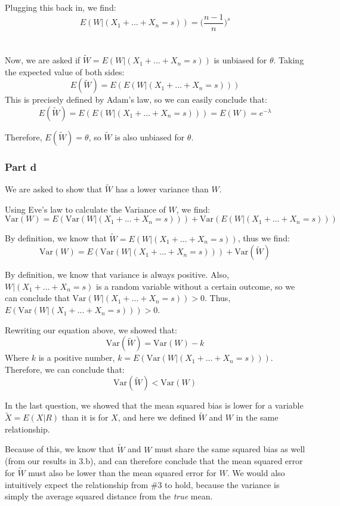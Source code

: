 \documentclass{article}
\begin{document}
Plugging this back in, we find:
$$E(W| (X_{1} + ... + X_{n} = s)) = \bigg(\frac{n - 1}{n}\bigg)^{s}$$
\\\\
Now, we are asked if $\tilde{W} = E(W| (X_{1} + ... + X_{n} = s))$ is unbiased for $\theta$. Taking the expected value of both sides:
$$E(\tilde{W}) = E(E(W| (X_{1} + ... + X_{n} = s)))$$
This is precisely defined by Adam's law, so we can easily conclude that:
$$E(\tilde{W}) = E(E(W| (X_{1} + ... + X_{n} = s))) = E(W) = e^{-\lambda}$$

Therefore, $E(\tilde{W}) = \theta$, so $\tilde{W}$ is also unbiased for $\theta$.

\subsubsection{Part d}
We are asked to show that $\tilde{W}$ has a lower variance than $W$.

Using Eve's law to calculate the Variance of $W$, we find:
$$\text{Var}(W) = E(\text{Var}(W | (X_{1} + ... + X_{n} = s))) + \text{Var}(E(W | (X_{1} + ... + X_{n} = s)))$$

By definition, we know that $\tilde{W} = E(W | (X_{1} + ... + X_{n} = s))$, thus we find:
$$\text{Var}(W) = E(\text{Var}(W | (X_{1} + ... + X_{n} = s))) + \text{Var}(\tilde{W})$$

By definition, we know that variance is always positive. Also, $W | (X_{1} + ... + X_{n} = s)$ is a random variable without a certain outcome, so we can conclude that $\text{Var}(W | (X_{1} + ... + X_{n} = s)) > 0$. Thus, $E(\text{Var}(W | (X_{1} + ... + X_{n} = s))) > 0$. 

Rewriting our equation above, we showed that:
$$\text{Var}(\tilde{W}) =  \text{Var}(W) - k$$
Where $k$ is a positive number, $k = E(\text{Var}(W | (X_{1} + ... + X_{n} = s)))$. Therefore, we can conclude that:
$$\text{Var}(\tilde{W}) < \text{Var}(W)$$

In the last question, we showed that the mean squared bias is lower for a variable $
\tilde{X} = E(X|R)$ than it is for $X$, and here we defined $\tilde{W}$ and $W$ in the same relationship. 

Because of this, we know that $\tilde{W}$ and $W$ must share the same squared bias as well (from our results in 3.b), and can therefore conclude that the mean squared error for $\tilde{W}$ must also be lower than the mean squared error for $W$. We would also intuitively expect the relationship from \#3 to hold, because the variance is simply the average squared distance from the \textit{true} mean.
\end{document}

